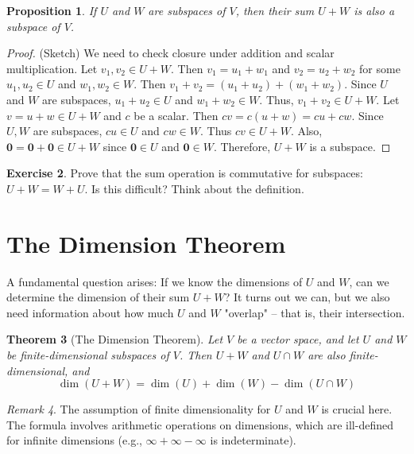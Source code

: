 \documentclass[11pt]{article}
\theoremstyle{plain}
\newtheorem{theorem}{Theorem}[section]
\newtheorem{proposition}[theorem]{Proposition}
\theoremstyle{definition}
\newtheorem{exercise}[theorem]{Exercise}
\theoremstyle{remark}
\newtheorem{remark}[theorem]{Remark}
\DeclareMathOperator{\dimv}{dim} %
\newcommand{\veczero}{\mathbf{0}} %
\begin{document}
\begin{proposition}
If $U$ and $W$ are subspaces of $V$, then their sum $U+W$ is also a subspace of $V$.
\end{proposition}
\begin{proof}
(Sketch) We need to check closure under addition and scalar multiplication.
Let $v_1, v_2 \in U+W$. Then $v_1 = u_1 + w_1$ and $v_2 = u_2 + w_2$ for some $u_1, u_2 \in U$ and $w_1, w_2 \in W$.
Then $v_1 + v_2 = (u_1 + u_2) + (w_1 + w_2)$. Since $U$ and $W$ are subspaces, $u_1+u_2 \in U$ and $w_1+w_2 \in W$. Thus, $v_1+v_2 \in U+W$.
Let $v = u+w \in U+W$ and $c$ be a scalar. Then $cv = c(u+w) = cu + cw$. Since $U, W$ are subspaces, $cu \in U$ and $cw \in W$. Thus $cv \in U+W$.
Also, $\veczero = \veczero + \veczero \in U+W$ since $\veczero \in U$ and $\veczero \in W$.
Therefore, $U+W$ is a subspace.
\end{proof}

\begin{exercise}
Prove that the sum operation is commutative for subspaces: $U+W = W+U$. Is this difficult? Think about the definition.
\end{exercise}

\section{The Dimension Theorem}

A fundamental question arises: If we know the dimensions of $U$ and $W$, can we determine the dimension of their sum $U+W$? It turns out we can, but we also need information about how much $U$ and $W$ "overlap" – that is, their intersection.

\begin{theorem}[The Dimension Theorem]
Let $V$ be a vector space, and let $U$ and $W$ be \emph{finite-dimensional} subspaces of $V$. Then $U+W$ and $U \cap W$ are also finite-dimensional, and
\[ \dimv(U+W) = \dimv(U) + \dimv(W) - \dimv(U \cap W) \]
\end{theorem}

\begin{remark}
The assumption of finite dimensionality for $U$ and $W$ is crucial here. The formula involves arithmetic operations on dimensions, which are ill-defined for infinite dimensions (e.g., $\infty + \infty - \infty$ is indeterminate).
\end{remark}
\end{document}

